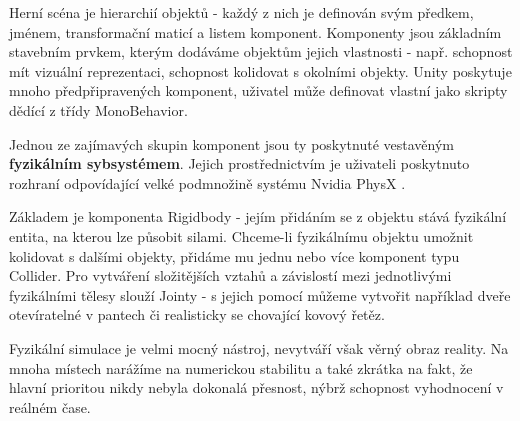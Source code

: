Herní scéna je hierarchií objektů - každý z nich je definován svým předkem, jménem, transformační maticí a listem komponent. Komponenty jsou základním stavebním prvkem, kterým dodáváme objektům jejich vlastnosti - např. schopnost mít vizuální reprezentaci, schopnost kolidovat s okolními objekty. Unity poskytuje mnoho předpřipravených komponent, uživatel může definovat vlastní jako skripty dědící z třídy MonoBehavior.

Jednou ze zajímavých skupin komponent jsou ty poskytnuté vestavěným \textbf{fyzikálním sybsystémem}. Jejich prostřednictvím je uživateli poskytnuto rozhraní odpovídající velké podmnožině systému Nvidia PhysX \cite{PhysX}. 

Základem je komponenta Rigidbody - jejím přidáním se z objektu stává fyzikální entita, na kterou lze působit silami. Chceme-li fyzikálnímu objektu umožnit kolidovat s dalšími objekty, přidáme mu jednu nebo více komponent typu Collider. Pro vytváření složitějších vztahů a závislostí mezi jednotlivými fyzikálními tělesy slouží Jointy - s jejich pomocí můžeme vytvořit například dveře otevíratelné v pantech či realisticky se chovající kovový řetěz.

Fyzikální simulace je velmi mocný nástroj, nevytváří však věrný obraz reality. Na mnoha místech narážíme na numerickou stabilitu a také zkrátka na fakt, že hlavní prioritou nikdy nebyla dokonalá přesnost, nýbrž schopnost vyhodnocení v reálném čase.
